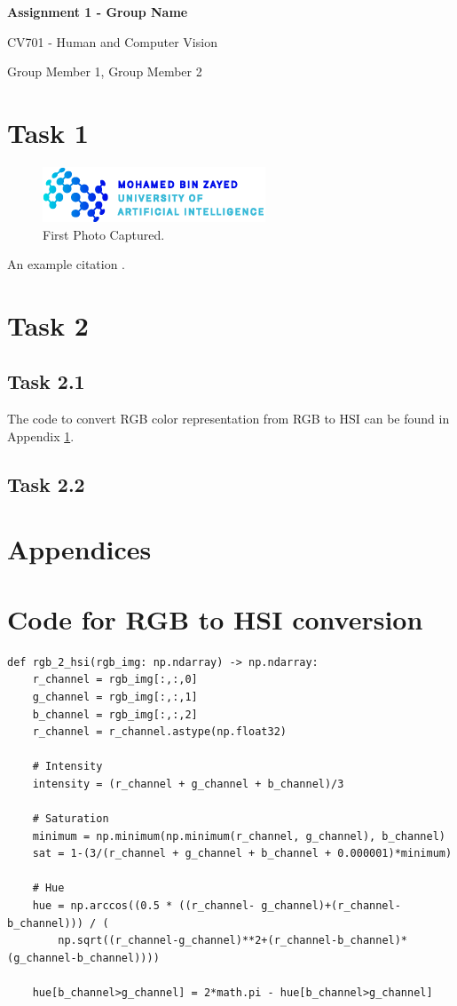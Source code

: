 \documentclass{article} %
\newcommand{\maketitletwo}[2][]{
\begin{center}
        \Large{\textbf{Assignment #1 - #2}
            
            CV701 - Human and Computer Vision} %
        \vspace{5pt}
        
        \normalsize{Group Member 1, Group Member 2  %
        
        }      
        \vspace{10pt}       
\end{center}
}
\begin{document}
\maketitletwo[1]{Group Name}  %

\section*{Task 1}

\begin{figure}[h]
    \centering
    \includegraphics[]{./images/thumbnail-MBZUAI-Logo.png}
    \caption{First Photo Captured.}
    \label{fig:photo1}
\end{figure}

An example citation \cite{Misra2020Jan}.

\section*{Task 2}

\subsection*{Task 2.1}
The code to convert RGB color representation from RGB to HSI can be found in Appendix \ref{app:rgb_to_hsi}.


\subsection*{Task 2.2}



\appendix

\section*{Appendices}
\section{ Code for RGB to HSI conversion}
\label{app:rgb_to_hsi}

\begin{lstlisting}
def rgb_2_hsi(rgb_img: np.ndarray) -> np.ndarray:
    r_channel = rgb_img[:,:,0]
    g_channel = rgb_img[:,:,1]
    b_channel = rgb_img[:,:,2]
    r_channel = r_channel.astype(np.float32)

    # Intensity
    intensity = (r_channel + g_channel + b_channel)/3

    # Saturation
    minimum = np.minimum(np.minimum(r_channel, g_channel), b_channel)
    sat = 1-(3/(r_channel + g_channel + b_channel + 0.000001)*minimum)

    # Hue
    hue = np.arccos((0.5 * ((r_channel- g_channel)+(r_channel-b_channel))) / (
        np.sqrt((r_channel-g_channel)**2+(r_channel-b_channel)*(g_channel-b_channel))))

    hue[b_channel>g_channel] = 2*math.pi - hue[b_channel>g_channel]
\end{lstlisting}
\end{document}
